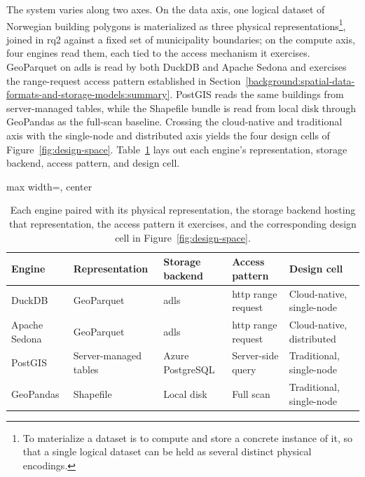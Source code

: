 The system varies along two axes. On the data axis, one logical dataset of Norwegian building polygons is materialized as three physical representations\footnote{To materialize a dataset is to compute and store a concrete instance of it, so that a single logical dataset can be held as several distinct physical encodings.}, joined in \acrshort{rq}2 against a fixed set of municipality boundaries; on the compute axis, four engines read them, each tied to the access mechanism it exercises. GeoParquet on \acrfull{adls} is read by both DuckDB and Apache Sedona and exercises the range-request access pattern established in Section~\ref{background:spatial-data-formats-and-storage-models:summary}. PostGIS reads the same buildings from server-managed tables, while the Shapefile bundle is read from local disk through GeoPandas as the full-scan baseline. Crossing the cloud-native and traditional axis with the single-node and distributed axis yields the four design cells of Figure~\ref{fig:design-space}. Table~\ref{tab:data-engine-mapping} lays out each engine's representation, storage backend, access pattern, and design cell.

\begin{table}[H]
    \centering
    \caption[Data representation to engine mapping]{Each engine paired with its physical representation, the storage backend hosting that representation, the access pattern it exercises, and the corresponding design cell in Figure~\ref{fig:design-space}.}
    \label{tab:data-engine-mapping}
    \begin{adjustbox}{max width=\textwidth, center}
    \begin{tabular}{@{}lllll@{}}
        \toprule
        Engine        & Representation        & Storage backend      & Access pattern                & Design cell                \\
        \midrule
        DuckDB        & GeoParquet            & \acrshort{adls}      & \acrshort{http} range request & Cloud-native, single-node  \\
        Apache Sedona & GeoParquet            & \acrshort{adls}      & \acrshort{http} range request & Cloud-native, distributed  \\
        PostGIS       & Server-managed tables & Azure PostgreSQL     & Server-side query             & Traditional, single-node   \\
        GeoPandas     & Shapefile             & Local disk           & Full scan                     & Traditional, single-node   \\
        \bottomrule
    \end{tabular}
    \end{adjustbox}
\end{table}

